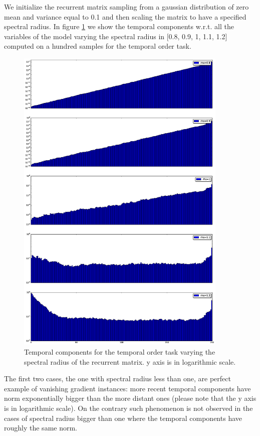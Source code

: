 We initialize the recurrent matrix sampling from a gaussian distribution of zero mean and variance equal to 0.1 and then scaling the matrix to have a specified spectral radius. In figure \ref{fig:temporal_norms} we show the temporal components w.r.t. all the variables of the model varying the spectral radius in [0.8, 0.9, 1, 1.1, 1.2] computed on a hundred samples for the temporal order task.

\begin{figure}
    \includegraphics[width=0.9\textwidth]{chapter3/temporal_components.eps}
    \caption{Temporal components for the temporal order task varying the spectral radius of the recurrent matrix. y axis is in logarithmic scale.}
    \label{fig:temporal_norms}
\end{figure}

The first two cases, the one with spectral radius less than one, are perfect example of vanishing gradient instances: more recent temporal components have norm exponentially bigger than the more distant ones (please note that the y axis is in logarithmic scale). On the contrary such phenomenon is not observed in the cases of spectral radius bigger than one where the temporal components have roughly the same norm.

